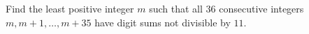 Find the least positive integer $m$ such that all $36$ consecutive integers $m,m+1,\ldots,m+35$ have digit sums not divisible by $11$.

